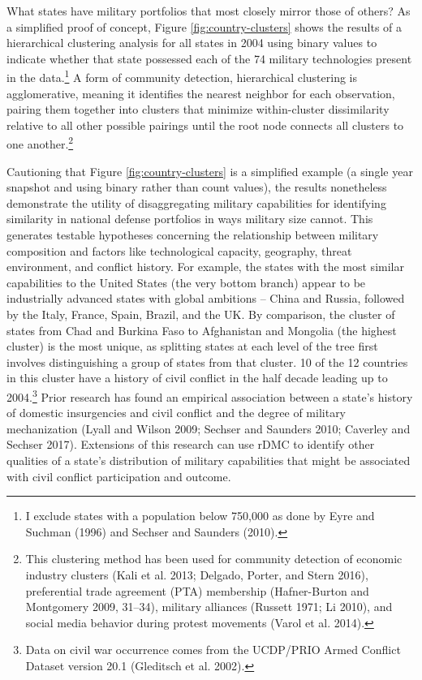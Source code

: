 \documentclass[
]{article}
\begin{document}
What states have military portfolios that most closely mirror those of others? As a simplified proof of concept, Figure \ref{fig:country-clusters} shows the results of a hierarchical clustering analysis for all states in 2004 using binary values to indicate whether that state possessed each of the 74 military technologies present in the data.\footnote{I exclude states with a population below 750,000 as done by Eyre and Suchman (1996) and Sechser and Saunders (2010).} A form of community detection, hierarchical clustering is agglomerative, meaning it identifies the nearest neighbor for each observation, pairing them together into clusters that minimize within-cluster dissimilarity relative to all other possible pairings until the root node connects all clusters to one another.\footnote{This clustering method has been used for community detection of economic industry clusters (Kali et al. 2013; Delgado, Porter, and Stern 2016), preferential trade agreement (PTA) membership (Hafner-Burton and Montgomery 2009, 31--34), military alliances (Russett 1971; Li 2010), and social media behavior during protest movements (Varol et al. 2014).}

Cautioning that Figure \ref{fig:country-clusters} is a simplified example (a single year snapshot and using binary rather than count values), the results nonetheless demonstrate the utility of disaggregating military capabilities for identifying similarity in national defense portfolios in ways military size cannot. This generates testable hypotheses concerning the relationship between military composition and factors like technological capacity, geography, threat environment, and conflict history. For example, the states with the most similar capabilities to the United States (the very bottom branch) appear to be industrially advanced states with global ambitions -- China and Russia, followed by the Italy, France, Spain, Brazil, and the UK. By comparison, the cluster of states from Chad and Burkina Faso to Afghanistan and Mongolia (the highest cluster) is the most unique, as splitting states at each level of the tree first involves distinguishing a group of states from that cluster. 10 of the 12 countries in this cluster have a history of civil conflict in the half decade leading up to 2004.\footnote{Data on civil war occurrence comes from the UCDP/PRIO Armed Conflict Dataset version 20.1 (Gleditsch et al. 2002).} Prior research has found an empirical association between a state's history of domestic insurgencies and civil conflict and the degree of military mechanization (Lyall and Wilson 2009; Sechser and Saunders 2010; Caverley and Sechser 2017). Extensions of this research can use rDMC to identify other qualities of a state's distribution of military capabilities that might be associated with civil conflict participation and outcome.
\end{document}
